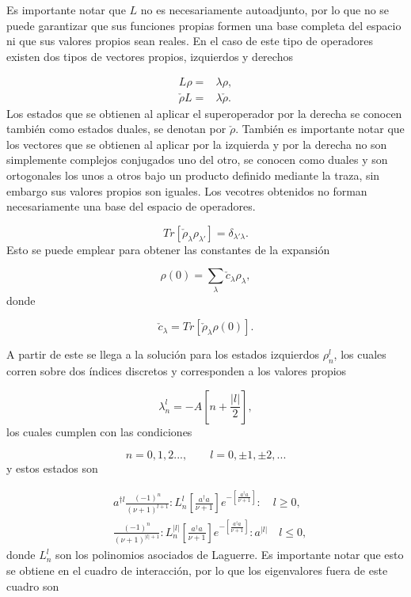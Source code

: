 \documentclass[10pt,a4paper]{report}
\begin{document}
Es importante notar que $L$ no es necesariamente autoadjunto, por lo que no se puede garantizar que sus funciones propias formen una base completa del espacio ni que sus valores propios sean reales. En el caso de este tipo de operadores existen dos tipos de vectores propios\cite{BarnettSD}, izquierdos y derechos

\begin{align*}
L\rho =& \lambda \rho, \\
\check{\rho} L =& \lambda \check{\rho}.
\end{align*} Los estados que se obtienen al aplicar el superoperador por la derecha se conocen también como estados duales, se denotan por $\check{\rho}$. También es importante notar que los vectores que se obtienen al aplicar por la izquierda y por la derecha no son simplemente complejos conjugados uno del otro, se conocen como duales y son ortogonales los unos a otros bajo un producto definido mediante la traza\cite{EnglertDB}, sin embargo sus valores propios son iguales. Los vecotres obtenidos no forman necesariamente una base del espacio de operadores. 

\begin{equation}
Tr[\check{\rho}_\lambda \rho_{\lambda'}] = \delta_{\lambda'\lambda}.
\end{equation} Esto se puede emplear para obtener las constantes de la expansión

\begin{equation}
\rho(0) = \sum_{\lambda} \check{c}_{\lambda} \rho_{\lambda},
\end{equation} donde

\begin{equation}
\check{c}_\lambda = Tr[\check{\rho}_\lambda \rho(0)].
\end{equation}

A partir de este se llega a la solución para los estados izquierdos $\rho_n^l$, los cuales corren sobre dos índices discretos y corresponden a los valores propios
\cite{EnglertDB}

\begin{equation}
\lambda_n^l = -A[n + \frac{|l|}{2}],
\end{equation} los cuales cumplen con las condiciones

\begin{equation}
n=0,1,2...,\qquad l = 0,\pm 1, \pm 2,... 
\end{equation} y estos estados son

\begin{align}\label{DefDB}
&a^{\dagger l}\frac{(-1)^n}{(\nu+1)^{l+1}}:L_n^l[\frac{a^\dagger a}{\nu+1}]e^{-[\frac{a^\dagger a}{\nu+1}]}:\quad l \geq 0, \\
&\frac{(-1)^n}{(\nu+1)^{|l|+1}}:L_n^{|l|}[\frac{a^\dagger a}{\nu+1}]e^{-[\frac{a^\dagger a}{\nu+1}]}:a^{|l|}\quad l \leq 0,
\end{align} donde $L_n^l$ son los polinomios asociados de Laguerre. Es importante notar que esto se obtiene en el cuadro de interacción,
por lo que los eigenvalores fuera de este cuadro son
\end{document}

